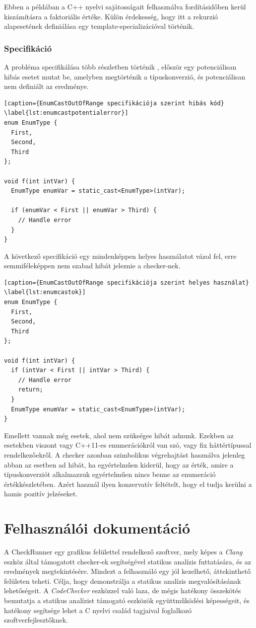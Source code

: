 \documentclass[a4paper,12pt]{report}
\begin{document}
Ebben a példában a C++ nyelvi sajátosságait felhasználva fordításidőben kerül kiszámításra a faktoriális értéke. Külön érdekesség, hogy itt a rekurzió alapesetének definiálása egy template-specializációval történik.


\subsection{Specifikáció}
A probléma specifikálása több részletben történik \cite{securecodingint50}, először egy potenciálisan hibás esetet mutat be, amelyben megtörténik a típuskonverzió, és potenciálisan nem definiált az eredménye.

\begin{lstlisting}[caption={EnumCastOutOfRange specifikációja szerint hibás kód}
\label{lst:enumcastpotentialerror}]
enum EnumType {
  First,
  Second,
  Third
};
 
void f(int intVar) {
  EnumType enumVar = static_cast<EnumType>(intVar);
 
  if (enumVar < First || enumVar > Third) {
    // Handle error
  }
}
\end{lstlisting}

A következő specifikáció egy mindenképpen helyes használatot vázol fel, erre semmiféleképpen nem szabad hibát jeleznie a checker-nek.

\begin{lstlisting}[caption={EnumCastOutOfRange specifikációja szerint helyes használat}
\label{lst:enumcastok}]
enum EnumType {
  First,
  Second,
  Third
};
 
void f(int intVar) {
  if (intVar < First || intVar > Third) {
    // Handle error
    return;
  }
  EnumType enumVar = static_cast<EnumType>(intVar);
}
\end{lstlisting}

Emellett vannak még esetek, ahol nem szükséges hibát adnunk. Ezekben az esetekben viszont vagy C++11-es enumerációkról van szó, vagy fix háttértípussal rendelkezőekről. A checker azonban szimbolikus végrehajtást használva jelenleg abban az esetben ad hibát, ha egyértelműen kiderül, hogy az érték, amire a típuskonverziót alkalmazzuk egyértelműen nincs benne az enumeráció értékkészletében. Azért használ ilyen konzervatív feltételt, hogy el tudja kerülni a hamis pozitív jelzéseket.

\chapter{Felhasználói dokumentáció}
A CheckRunner egy grafikus felülettel rendelkező szoftver, mely képes a \emph{Clang} eszköz által támogatott checker-ek segítségével statikus analízis futtatására, és az eredmények megtekintésére. Mindezt a felhasználó egy jól kezelhető, áttekinthető felületen teheti. Célja, hogy demonstrálja a statikus analízis megvalósításának lehetőségeit. A \emph{CodeChecker} eszközzel való laza, de mégis hatékony összekötés bemutatja a statikus analízist támogató eszközök együttműködési képességeit, és hatékony segítsége lehet a C nyelvi család tagjaival foglalkozó szoftverfejlesztőknek.
\end{document}
